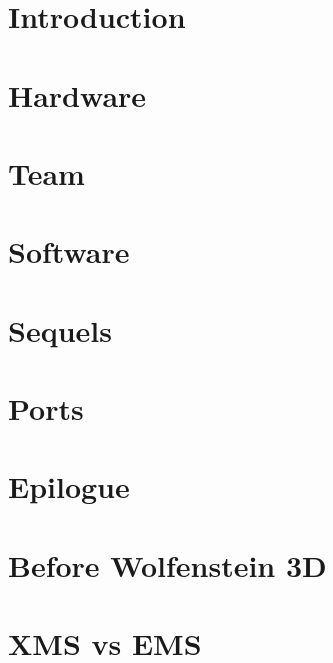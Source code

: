 \documentclass[8pt]{book}
\begin{document}
    \chapter{Introduction}
      
  
    \chapter{Hardware}
      

  
    \chapter{Team}
      
      
    \chapter{Software}
       
       
      
       
       
      
       
    
  
           


\chapter{Sequels}
        
        

    \chapter{Ports}        
        
        
    
       \chapter{Epilogue}
        

        \appendix
    \appendixpage

\chapter{Before Wolfenstein 3D}
        
    
    \chapter{XMS vs EMS} 
          
\end{document}

